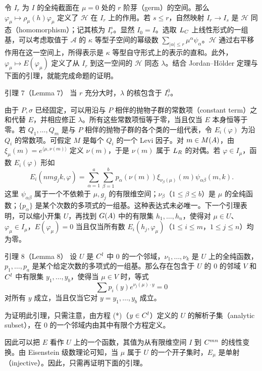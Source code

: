 令 $I_r$ 为 $I$ 的全纯截面在 $\mu=0$ 处的 $r$ 阶芽（germ）的空间。那么 $\varphi_\mu\mapsto\rho_\mu(h)\varphi_\mu$ 定义了 $\mathcal H$ 在 $I_r$ 上的作用。若 $s\leq r$，自然映射 $I_r\to I_s$ 是 $\mathcal H$ 同态（homomorphism）；记其核为 $I_r^s$。显然 $I_0=I$。选取 $L_C$ 上线性形式的一组基，可以考虑取值于 $\mathcal A$ 的 $\kappa$ 等型子空间的幂级数 $\sum_{|\alpha|\leq r}\mu^\alpha\psi_\alpha$。$\mathcal H$ 通过右平移作用在这一空间上，所得表示是 $\kappa$ 等型自守形式上的表示的直和。此外，$\varphi_\mu\mapsto E(\varphi_\mu)$ 定义了从 $I_r$ 到这一空间的 $\mathcal H$ 同态 $\lambda$。结合 Jordan--Hölder 定理与下面的引理，就能完成命题的证明。

\begin{originaltheorem}{引理 7（Lemma 7）}
当 $r$ 充分大时，$\lambda$ 的核包含于 $I_r^0$。
\end{originaltheorem}
由于 $P,\sigma$ 已经固定，可以用沿与 $P$ 相伴的抛物子群的常数项（constant term）之和代替 $E$，并相应修正 $\lambda$。所有这些常数项恒等于零，当且仅当 $E$ 本身恒等于零。若 $Q_1,\ldots,Q_m$ 是与 $P$ 相伴的抛物子群的各个类的一组代表，令 $E_i(\varphi)$ 为沿 $Q_i$ 的常数项。可假定 $M$ 是每个 $Q_i$ 的一个 Levi 因子。对 $m\in M(A)$，由 $\xi_\mu(m)=e^{\langle\mu,\nu(m)\rangle}$ 定义 $\nu(m)$，于是 $\nu(m)$ 属于 $L_R$ 的对偶。若 $\varphi\in I_\mu$，函数 $E_i(\varphi)$ 形如
\[
E_i(nmg_jk,\varphi)=\sum_{\alpha=1}^{a}\sum_{\beta=1}^{b}
 p_\alpha(\nu(m))\xi_{\nu_\beta(\mu)}(m)\psi_{\alpha\beta}(m,k).
\]
这里 $\psi_{\alpha\beta}$ 属于一个不依赖于 $\mu,g_j$ 的有限维空间；$\nu_\beta$（$1\leq\beta\leq b$）是 $\mu$ 的全纯函数；$\{p_\alpha\}$ 是某个次数的多项式的一组基。这种表达式未必唯一。下一个引理表明，可以缩小开集 $U$，再找到 $G(A)$ 中的有限集 $h_1,\ldots,h_n$，使得对 $\mu\in U$、$\varphi_\mu\in I_\mu$，$E(\varphi_\mu)=0$ 当且仅当所有数 $E_i(h_j,\varphi_\mu)$（$1\leq i\leq m$，$1\leq j\leq n$）均为零。

\begin{originaltheorem}{引理 8（Lemma 8）}
设 $U$ 是 $C^l$ 中 $0$ 的一个邻域，$\nu_1,\ldots,\nu_k$ 是 $U$ 上的全纯函数，$p_1,\ldots,p_a$ 是某个给定次数的多项式的一组基。那么存在包含于 $U$ 的 $0$ 的邻域 $V$ 和 $C^l$ 中有限集 $y_1,\ldots,y_b$，使得当 $\mu\in V$ 时，等式
\[
\sum p_i(y)e^{\nu_j(\mu)\cdot y}=0\tag{*}
\]
对所有 $y$ 成立，当且仅当它对 $y=y_1,\ldots,y_b$ 成立。
\end{originaltheorem}
为证明此引理，只需注意，由方程 (*)（$y\in C^l$）定义的 $U$ 的解析子集（analytic subset），在 $0$ 的一个邻域内由其中有限个方程定义。

因此可以把 $E$ 看作 $U$ 上的一个函数，其值为从有限维空间 $I$ 到 $C^{mn}$ 的线性变换。由 Eisenstein 级数理论可知，当 $\mu$ 属于 $U$ 的一个开子集时，$E_\mu$ 是单射（injective）。因此，只需再证明下面的引理。

